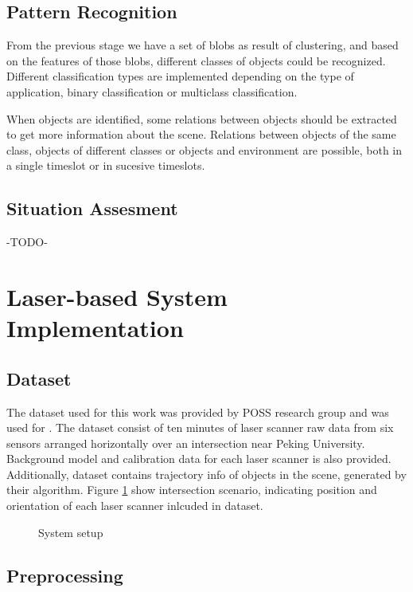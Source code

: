 \documentclass[10pt,twocolumn,letterpaper]{article}
\begin{document}
\subsection{Pattern Recognition}

From the previous stage we have a set of blobs as result of clustering, and based on the features of those blobs, different classes of objects could be recognized. Different classification types are implemented depending on the type of application, binary classification or multiclass classification.

When objects are identified, some relations between objects should be extracted to get more information about the scene. Relations between objects of the same class, objects of different classes or objects and environment are possible, both in a single timeslot or in sucesive timeslots. 

\subsection{Situation Assesment}

-TODO-

\section{Laser-based System Implementation}

\subsection{Dataset}
 The dataset used for this work was provided by POSS research group and was used for \cite{Zhao2009}. The dataset consist of ten minutes of laser scanner raw data from six sensors arranged horizontally over an intersection near Peking University. Background model and calibration data for each laser scanner is also provided. Additionally, dataset contains trajectory info of objects in the scene, generated by their algorithm. Figure \ref{inter_cfg} show intersection scenario, indicating position and orientation of each laser scanner inlcuded in dataset.
 
\begin{figure}[ht!]
\centering


\caption{System setup}
\label{inter_cfg}
\end{figure}
 
\subsection{Preprocessing}
\end{document}
